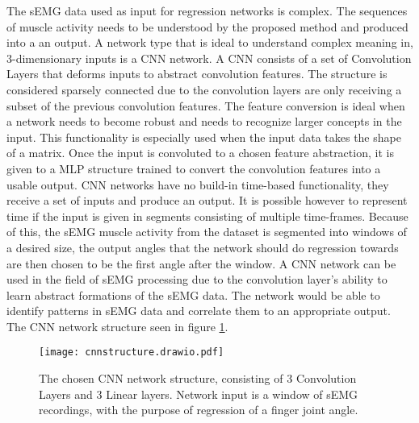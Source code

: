 \documentclass[../main.tex]{subfiles}
\begin{document}
The sEMG data used as input for regression networks is complex.
The sequences of muscle activity needs to be understood by the proposed method and produced into a an output.
A network type that is ideal to understand complex meaning in, 3-dimensionary inputs is a CNN network.
A CNN consists of a set of Convolution Layers that deforms inputs to abstract convolution features.
The structure is considered sparsely connected due to the convolution layers are only receiving a subset of the previous convolution features.
The feature conversion is ideal when a network needs to become robust and needs to recognize larger concepts in the input.
This functionality is especially used when the input data takes the shape of a matrix.
Once the input is convoluted to a chosen feature abstraction, it is given to a MLP structure trained to convert the convolution features into a usable output.
CNN networks have no build-in time-based functionality, they receive a set of inputs and produce an output.
It is possible however to represent time if the input is given in segments consisting of multiple time-frames.
Because of this, the sEMG muscle activity from the dataset is segmented into windows of a desired size, the output angles that the network should do regression towards are then chosen to be the first angle after the window.
A CNN network can be used in the field of sEMG processing due to the convolution layer's ability to learn abstract formations of the sEMG data.
The network would be able to identify patterns in sEMG data and correlate them to an appropriate output.
The CNN network structure seen in figure \ref{fig:cnn_structure}.

\begin{figure}[H]
\begin{center}
\texttt{[image: cnnstructure.drawio.pdf]}
\caption{The chosen CNN network structure, consisting of 3 Convolution Layers and 3 Linear layers. Network input is a window of sEMG recordings, with the purpose of regression of a finger joint angle.}
\label{fig:cnn_structure}
\end{center}
\end{figure}
\end{document}
